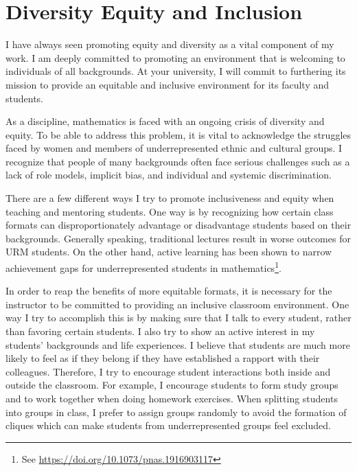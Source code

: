 \documentclass{article}
\begin{document}
\section*{Diversity Equity and Inclusion}

I have always seen promoting equity and diversity as a vital component of my work. I am deeply committed to promoting an environment that is welcoming to individuals of all backgrounds. At your university, I will commit to furthering its mission to provide an equitable and inclusive environment for its faculty and students.

As a discipline, mathematics is faced with an ongoing crisis of diversity and equity. To be able to address this problem, it is vital to acknowledge the struggles faced by women and members of underrepresented ethnic and cultural groups. I recognize that people of many backgrounds often face serious challenges such as a lack of role models, implicit bias, and individual and systemic discrimination. 

There are a few different ways I try to promote inclusiveness and equity when teaching and mentoring students. One way is by recognizing how certain class formats can disproportionately advantage or disadvantage students based on their backgrounds. Generally speaking, traditional lectures result in worse outcomes for URM students. On the other hand, active learning has been shown to narrow achievement gaps for underrepresented students in mathematics\footnote{See \url{https://doi.org/10.1073/pnas.1916903117}}. 

In order to reap the benefits of more equitable formats, it is necessary for the instructor to be committed to providing an inclusive classroom environment. One way I try to accomplish this is by making sure that I talk to every student, rather than favoring certain students. I also try to show an active interest in my students' backgrounds and life experiences. I believe that students are much more likely to feel as if they belong if they have established a rapport with their colleagues. Therefore, I try to encourage student interactions both inside and outside the classroom. For example, I encourage students to form study groups and to work together when doing homework exercises. When splitting students into groups in class, I prefer to assign groups randomly to avoid the formation of cliques which can make students from underrepresented groups feel excluded.
\end{document}
